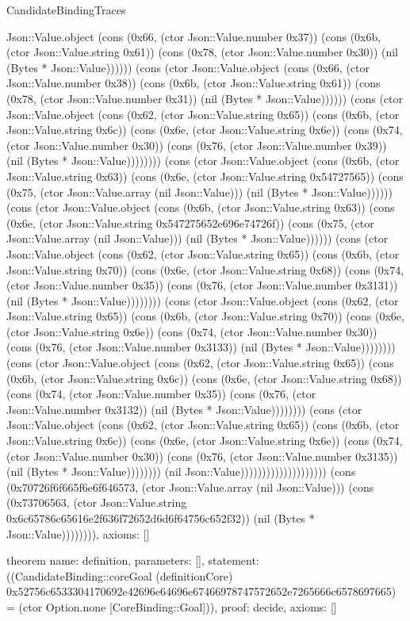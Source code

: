 \begin{lexlean}{CandidateBindingTraces}
\begin{semanticmodule}
{Json::Value.object (cons (0x66, (ctor Json::Value.number 0x37)) (cons (0x6b, (ctor Json::Value.string 0x61)) (cons (0x78, (ctor Json::Value.number 0x30)) (nil (Bytes * Json::Value)))))) (cons (ctor Json::Value.object (cons (0x66, (ctor Json::Value.number 0x38)) (cons (0x6b, (ctor Json::Value.string 0x61)) (cons (0x78, (ctor Json::Value.number 0x31)) (nil (Bytes * Json::Value)))))) (cons (ctor Json::Value.object (cons (0x62, (ctor Json::Value.string 0x65)) (cons (0x6b, (ctor Json::Value.string 0x6c)) (cons (0x6e, (ctor Json::Value.string 0x6e)) (cons (0x74, (ctor Json::Value.number 0x30)) (cons (0x76, (ctor Json::Value.number 0x39)) (nil (Bytes * Json::Value)))))))) (cons (ctor Json::Value.object (cons (0x6b, (ctor Json::Value.string 0x63)) (cons (0x6e, (ctor Json::Value.string 0x54727565)) (cons (0x75, (ctor Json::Value.array (nil Json::Value))) (nil (Bytes * Json::Value)))))) (cons (ctor Json::Value.object (cons (0x6b, (ctor Json::Value.string 0x63)) (cons (0x6e, (ctor Json::Value.string 0x547275652e696e74726f)) (cons (0x75, (ctor Json::Value.array (nil Json::Value))) (nil (Bytes * Json::Value)))))) (cons (ctor Json::Value.object (cons (0x62, (ctor Json::Value.string 0x65)) (cons (0x6b, (ctor Json::Value.string 0x70)) (cons (0x6e, (ctor Json::Value.string 0x68)) (cons (0x74, (ctor Json::Value.number 0x35)) (cons (0x76, (ctor Json::Value.number 0x3131)) (nil (Bytes * Json::Value)))))))) (cons (ctor Json::Value.object (cons (0x62, (ctor Json::Value.string 0x65)) (cons (0x6b, (ctor Json::Value.string 0x70)) (cons (0x6e, (ctor Json::Value.string 0x6e)) (cons (0x74, (ctor Json::Value.number 0x30)) (cons (0x76, (ctor Json::Value.number 0x3133)) (nil (Bytes * Json::Value)))))))) (cons (ctor Json::Value.object (cons (0x62, (ctor Json::Value.string 0x65)) (cons (0x6b, (ctor Json::Value.string 0x6c)) (cons (0x6e, (ctor Json::Value.string 0x68)) (cons (0x74, (ctor Json::Value.number 0x35)) (cons (0x76, (ctor Json::Value.number 0x3132)) (nil (Bytes * Json::Value)))))))) (cons (ctor Json::Value.object (cons (0x62, (ctor Json::Value.string 0x65)) (cons (0x6b, (ctor Json::Value.string 0x6c)) (cons (0x6e, (ctor Json::Value.string 0x6e)) (cons (0x74, (ctor Json::Value.number 0x30)) (cons (0x76, (ctor Json::Value.number 0x3135)) (nil (Bytes * Json::Value)))))))) (nil Json::Value)))))))))))))))))))) (cons (0x70726f6f665f6e6f646573, (ctor Json::Value.array (nil Json::Value))) (cons (0x73706563, (ctor Json::Value.string 0x6c65786c65616e2f636f72652d6d6f64756c652f32)) (nil (Bytes * Json::Value)))))))),
 axioms: []
}

theorem{
 name: definition,
 parameters: [],
 statement: ((CandidateBinding::coreGoal (definitionCore) 0x52756c6533304170692e42696e64696e67466978747572652e7265666c6578697665) = (ctor Option.none [CoreBinding::Goal])),
 proof: decide{},
 axioms: []
}


\end{semanticmodule}
\end{lexlean}
